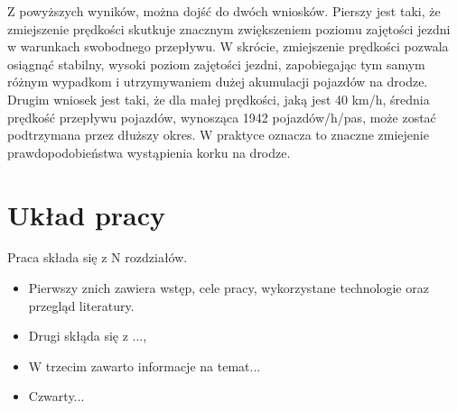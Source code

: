 Z powyższych wyników, można dojść do dwóch wniosków. Pierszy jest taki, że zmiejszenie prędkości skutkuje znacznym zwiększeniem poziomu zajętości jezdni w warunkach swobodnego przepływu. W skrócie, zmiejszenie prędkości pozwala osiągnąć stabilny, wysoki poziom zajętości jezdni, zapobiegając tym samym różnym wypadkom i utrzymywaniem dużej akumulacji pojazdów na drodze. Drugim wniosek jest taki, że dla małej prędkości, jaką jest 40 km/h, średnia prędkość przepływu pojazdów, wynosząca 1942 pojazdów/h/pas, może zostać podtrzymana przez dłuższy okres. W praktyce oznacza to znaczne zmiejenie prawdopodobieństwa wystąpienia korku na drodze.  

\section{Układ pracy}
\label{sec:ukladPracy}

Praca składa się z N rozdziałów. 

\begin{itemize}
\item Pierwszy znich zawiera wstęp, cele pracy, wykorzystane technologie oraz przegląd literatury. 
\item Drugi skłąda się z ..., 
\item W trzecim zawarto informacje na temat...
\item Czwarty...
\end{itemize}